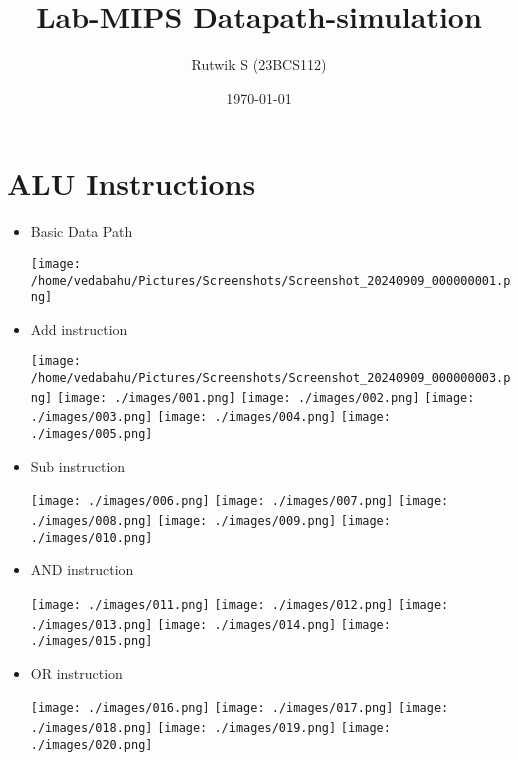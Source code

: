 \documentclass[a4paper, 12pt]{article}
\title{Lab-MIPS Datapath-simulation}
\author{Rutwik S (23BCS112)}
\date{\today}
\begin{document}
	\maketitle
	\section{ALU Instructions}
	\begin{itemize}
		\item Basic Data Path
		
		\texttt{[image: /home/vedabahu/Pictures/Screenshots/Screenshot\_20240909\_000000001.png]}
		
		\newpage
		
		\item Add instruction
		
		\texttt{[image: /home/vedabahu/Pictures/Screenshots/Screenshot\_20240909\_000000003.png]}
		\texttt{[image: ./images/001.png]}
		\texttt{[image: ./images/002.png]}
		\texttt{[image: ./images/003.png]}
		\texttt{[image: ./images/004.png]}
		\texttt{[image: ./images/005.png]}
		
		\newpage
		
		\item Sub instruction
		
		\texttt{[image: ./images/006.png]}
		\texttt{[image: ./images/007.png]}
		\texttt{[image: ./images/008.png]}
		\texttt{[image: ./images/009.png]}
		\texttt{[image: ./images/010.png]}
		
		\newpage
		
		\item AND instruction
		
		\texttt{[image: ./images/011.png]}
		\texttt{[image: ./images/012.png]}
		\texttt{[image: ./images/013.png]}
		\texttt{[image: ./images/014.png]}
		\texttt{[image: ./images/015.png]}
		
		\newpage
		
		\item OR instruction
		
		\texttt{[image: ./images/016.png]}
		\texttt{[image: ./images/017.png]}
		\texttt{[image: ./images/018.png]}
		\texttt{[image: ./images/019.png]}
		\texttt{[image: ./images/020.png]}
		
	\end{itemize}
	
\end{document}

